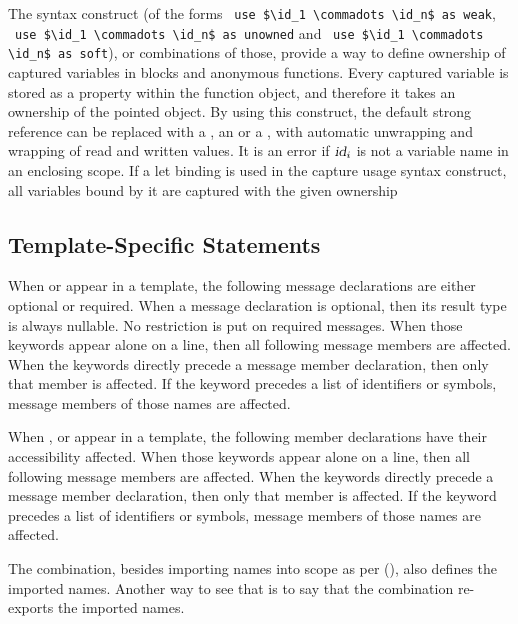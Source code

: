 The  syntax construct (of the forms ~\lstinline{use $\id_1 \commadots \id_n$ as weak}, ~\lstinline{use $\id_1 \commadots \id_n$ as unowned} and ~\lstinline{use $\id_1 \commadots \id_n$ as soft}), or combinations of those, provide a way to define ownership of captured variables in blocks and anonymous functions. Every captured variable is stored as a property within the function object, and therefore it takes an ownership of the pointed object. By using this construct, the default strong reference can be replaced with a , an  or a , with automatic unwrapping and wrapping of read and written values. It is an error if $\mbox{\sl id}_i$ is not a variable name in an enclosing scope. If a let binding is used in the capture usage syntax construct, all variables bound by it are captured with the given ownership






\subsection{Template-Specific Statements}

When  or  appear in a template, the following message declarations are either optional or required. When a message declaration is optional, then its result type is always nullable. No restriction is put on required messages. When those keywords appear alone on a line, then all following message members are affected. When the keywords directly precede a message member declaration, then only that member is affected. If the keyword precedes a list of identifiers or symbols, message members of those names are affected. 

When ,  or  appear in a template, the following member declarations have their accessibility affected. When those keywords appear alone on a line, then all following message members are affected. When the keywords directly precede a message member declaration, then only that member is affected. If the keyword precedes a list of identifiers or symbols, message members of those names are affected. 

The  combination, besides importing names into scope as per (), also defines the imported names. Another way to see that is to say that the combination re-exports the imported names. 





